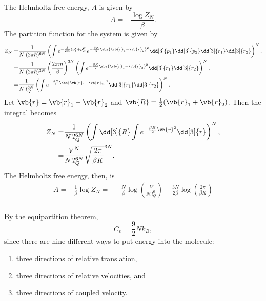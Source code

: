 \documentclass[a4paper,12pt,twoside]{article}
\begin{document}
\begin{multicols*}{2}
\subsection{}%
\subsubsection{}
The Helmholtz free energy, $A$ is given by
\begin{equation}
	A = -\frac{\log Z_N}{\beta}.
\end{equation}
The partition function for the system is given by
\begin{align}
	Z_N =& \frac{1}{N!(2\pi\hbar)^{6N}}\left( \int e^{-\frac{\beta}{2m}(p_1^2+p_2^2)}e^{-\frac{\beta K}{2}\abs{\vb{r}_1-\vb{r}_2}^2}\dd[3]{p_1}\dd[3]{p_2}\dd[3]{r_1}\dd[3]{r_2}\right)^N,\\
	=& \frac{1}{N!(2\pi\hbar)^{3N}} \left(\frac{2\pi m}{\beta}\right)^{3N}\left( \int e^{-\frac{\beta K}{2}\abs{\vb{r}_1-\vb{r}_2}^2}\dd[3]{r_1}\dd[3]{r_2}\right)^N,\\
	=& \frac{1}{N!l_Q^{6N}}\left(\int e^{-\frac{\beta K}{2}\abs{\vb{r}_1-\vb{r}_2}^2}\dd[3]{r_1}\dd[3]{r_2}\right)^N.
\end{align}
Let $\vb{r} = \vb{r}_1 - \vb{r}_2$ and $\vb{R} = \frac{1}{2}(\vb{r}_1 + \vb{r}_2)$.
Then the integral becomes
\begin{align}
	Z_N =& \frac{1}{N!l_Q^{6N}}\left(\int \dd[3]{R}\int e^{-\frac{\beta K}{2}\vb{r}^2}\dd[3]{r}\right)^N,\\
	=& \frac{V^N}{N!l_Q^{6N}} \sqrt{\frac{2\pi}{\beta K}}^{3N}.
\end{align}
The Helmholtz free energy, then, is
\begin{align}
	A = -\frac{1}{\beta}\log{Z_N} =& -\frac{N}{\beta} \log(\frac{V}{N!l_Q^6})-\frac{3N}{2\beta}\log(\frac{2\pi}{\beta K})
\end{align}
\subsubsection{}
By the equipartition theorem,
\begin{equation}
	C_v = \frac{9}{2}N k_B,
\end{equation}
since there are nine different ways to put energy into the molecule:
\begin{enumerate}
	\item three directions of relative translation,
	\item three directions of relative velocities, and
	\item three directions of coupled velocity.
\end{enumerate}

\end{multicols*}
\end{document}
